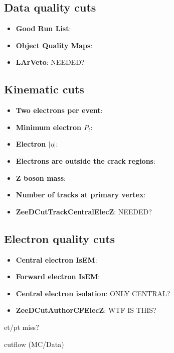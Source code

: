 \subsection{Data quality cuts}
\label{sec:Sel_GRL_OQ}

\begin{itemize}
\item {\bfseries Good Run List}:
\item {\bfseries Object Quality Maps}:
\item {\bfseries LArVeto}: \tbu NEEDED?
\end{itemize}

\subsection{Kinematic cuts}
\label{sec:Sel_kinematic}

\begin{itemize}
\item {\bfseries Two electrons per event}:
\item {\bfseries Minimum electron $P_{t}$}:
\item {\bfseries Electron $|\eta|$}:
\item {\bfseries Electrons are outside the crack regions}:
\item {\bfseries Z boson mass}:
\item {\bfseries Number of tracks at primary vertex}:
\item {\bfseries ZeeDCutTrackCentralElecZ}: \tbu NEEDED?
\end{itemize}

\subsection{Electron quality cuts}
\label{sec:Sel_isem_iso}

\begin{itemize}
\item {\bfseries Central electron IsEM}:
\item {\bfseries Forward electron IsEM}:
\item {\bfseries Central electron isolation}: \tbu ONLY CENTRAL?
\item {\bfseries ZeeDCutAuthorCFElecZ}: \tbu WTF IS THIS?
\end{itemize}

\tbu et/pt miss?

cutflow (MC/Data)
